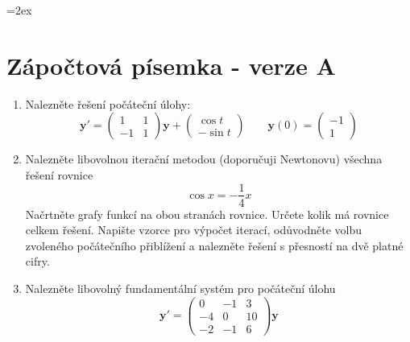 \documentclass[a4paper,10pt]{article}
\def\vc#1{\mathbf{\boldsymbol{#1}}}     %
\begin{document}
\parskip=2ex
\parindent=0pt
\pagestyle{empty}
\section*{Zápočtová písemka - verze A}
\begin{enumerate}
 \item 
   Nalezněte řešení počáteční úlohy:
   \[
    \vc y'=\begin{pmatrix}
          1 & 1 \\ -1 & 1
       \end{pmatrix} \vc y
       +
       \begin{pmatrix}
         \cos t \\ -\sin t
       \end{pmatrix}
    \qquad
    \vc y(0)=\begin{pmatrix}
           -1 \\ 1
         \end{pmatrix}
   \]
 \item 
    Nalezněte libovolnou iterační metodou (doporučuji Newtonovu) všechna řešení rovnice
    \[
       \cos x=-\frac14 x
    \]
    Načrtněte grafy funkcí na obou stranách rovnice. Určete kolik má rovnice celkem řešení.
    Napište vzorce pro výpočet iterací, odůvodněte volbu zvoleného počátečního přiblížení
    a nalezněte řešení s přesností na dvě platné cifry.
 \item
    Nalezněte libovolný fundamentální systém pro počáteční úlohu
    \[
    \vc y'=\begin{pmatrix}
          0 & -1 & 3 \\ 
          -4 & 0 & 10 \\
          -2 & -1 & 6
       \end{pmatrix} \vc y   
    \]
\end{enumerate}

\pagebreak
\end{document}
